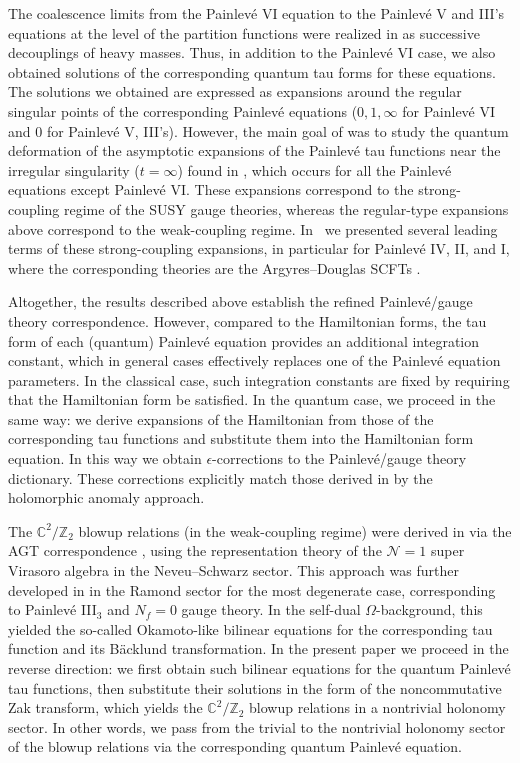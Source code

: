 \documentclass[12pt,a4paper]{article}
\numberwithin{equation}{section}
\begin{document}
The coalescence limits from the Painlev\'e VI equation to the Painlev\'e V and III's equations at the level of the partition functions were realized in \cite{BST25} as successive decouplings of heavy masses. Thus, in addition to the Painlev\'e VI case, we also obtained solutions of the corresponding quantum tau forms for these equations. 
The solutions we obtained are expressed as expansions around the regular singular points of the corresponding Painlev\'e equations ($0,1,\infty$ for Painlev\'e VI and $0$ for Painlev\'e V, III's). However, the main goal of \cite{BST25} was to study the quantum deformation of the asymptotic expansions of the Painlev\'e tau functions near the irregular singularity ($t=\infty$) found in \cite{BLMST16}, which occurs for all the Painlev\'e equations except Painlev\'e VI. These expansions correspond to the strong-coupling regime of the SUSY gauge theories, whereas the regular-type expansions above correspond to the weak-coupling regime. In~\cite{BST25} we presented several leading terms of these strong-coupling expansions, in particular 
for Painlev\'e IV, II, and I, where the corresponding theories are the Argyres--Douglas SCFTs \cite{BLMST16}.

Altogether, the results described above establish the refined  Painlev\'e/gauge theory correspondence. However, compared to the Hamiltonian forms, the tau form of each (quantum) Painlev\'e equation provides an additional integration constant, which in general cases effectively replaces one of the Painlev\'e equation parameters. In the classical case, such integration constants are fixed by requiring that the Hamiltonian form be satisfied. In the quantum case, we proceed in the same way: we derive expansions of the Hamiltonian from those of the corresponding tau functions and substitute them into the Hamiltonian form equation. In this way we obtain $\epsilon$-corrections to the Painlev\'e/gauge theory dictionary. These corrections explicitly match those derived in \cite{BST25} by the holomorphic anomaly approach. 

The $\mathbb{C}^2/\mathbb{Z}_2$ blowup relations (in the weak-coupling regime) were derived in \cite{BS14} via the AGT correspondence \cite{AGT09}, using the representation theory of the $\mathcal{N}=1$ super Virasoro algebra in the Neveu--Schwarz sector. This approach was further developed in \cite{BS16b} in the Ramond sector for the most degenerate case, corresponding to Painlev\'e III$_3$ and $N_f=0$ gauge theory. In the self-dual $\Omega$-background, this yielded the so-called Okamoto-like bilinear equations for the corresponding tau function and its B\"acklund transformation. In the present paper we proceed in the reverse direction: we first obtain such bilinear equations for the quantum Painlev\'e tau functions, then substitute their solutions in the form of the noncommutative Zak transform, which yields the $\mathbb{C}^2/\mathbb{Z}_2$ blowup relations in a nontrivial holonomy sector.
In other words, we pass from the trivial to the nontrivial holonomy sector of the blowup relations via the corresponding quantum Painlev\'e equation. 
\end{document}
